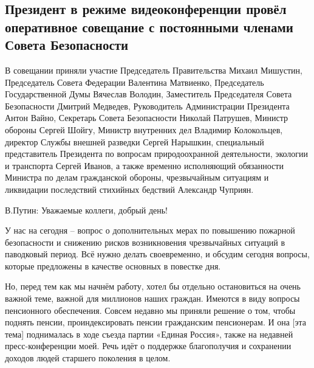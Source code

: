  
 
 
 
 
\subsection{Президент в режиме видеоконференции провёл оперативное совещание с постоянными членами Совета Безопасности}
\label{sec:21_01_2022.stz.gov.ru.kremlin.1.prezident_video_soveschanie_sovbez}
 

В совещании приняли участие Председатель Правительства Михаил Мишустин,
Председатель Совета Федерации Валентина Матвиенко, Председатель Государственной
Думы Вячеслав Володин, Заместитель Председателя Совета Безопасности Дмитрий
Медведев, Руководитель Администрации Президента Антон Вайно, Секретарь Совета
Безопасности Николай Патрушев, Министр обороны Сергей Шойгу, Министр внутренних
дел Владимир Колокольцев, директор Службы внешней разведки Сергей Нарышкин,
специальный представитель Президента по вопросам природоохранной деятельности,
экологии и транспорта Сергей Иванов, а также временно исполняющий обязанности
Министра по делам гражданской обороны, чрезвычайным ситуациям и ликвидации
последствий стихийных бедствий Александр Чуприян.


В.Путин: Уважаемые коллеги, добрый день!

У нас на сегодня – вопрос о дополнительных мерах по повышению пожарной
безопасности и снижению рисков возникновения чрезвычайных ситуаций в паводковый
период. Всё нужно делать своевременно, и обсудим сегодня вопросы, которые
предложены в качестве основных в повестке дня.

Но, перед тем как мы начнём работу, хотел бы отдельно остановиться на очень
важной теме, важной для миллионов наших граждан. Имеются в виду вопросы
пенсионного обеспечения. Совсем недавно мы приняли решение о том, чтобы поднять
пенсии, проиндексировать пенсии гражданским пенсионерам. И она [эта тема]
поднималась в ходе съезда партии «Единая Россия», также на недавней
пресс-конференции моей. Речь идёт о поддержке благополучия и сохранении доходов
людей старшего поколения в целом.

